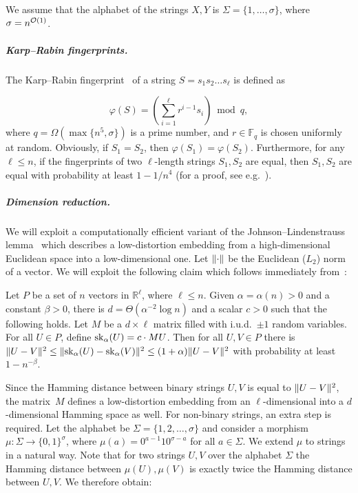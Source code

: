We assume that the alphabet of the strings $X, Y$ is $\Sigma = \{1,\ldots,\sigma\}$, where $\sigma = n^{\mathcal{O}(1)}$.

\subparagraph*{Karp--Rabin fingerprints. } The Karp--Rabin fingerprint~\cite{DBLP:journals/ibmrd/KarpR87} of a string $S = s_1 s_2 \dots s_\ell$ is defined as

$$\varphi(S) = \left(\sum_{i = 1}^{\ell} r^{i-1} s_i\right) \bmod q,$$ 
%
where $q = \Omega(\max\{n^5, \sigma\})$ is a prime number, and $r \in \mathbb{F}_q$ is chosen uniformly at random.  Obviously, if $S_1 = S_2$, then $\varphi(S_1) = \varphi(S_2)$. Furthermore, for any $\ell \le n$, if the fingerprints of two $\ell$-length strings $S_1, S_2$ are equal, then $S_1, S_2$ are equal with probability at least $1-1/n^4$ (for a proof, see e.g.~\cite{Porat:09}).

\subparagraph*{Dimension reduction. } We will exploit a computationally efficient variant of the Johnson--Lindenstrauss lemma~\cite{MR737400} which describes a low-distortion embedding from a high-dimensional Euclidean space into a low-dimensional one. Let $\lVert\cdot\rVert$ be the Euclidean ($L_2$) norm of a vector. We will exploit the following claim which follows immediately from~\cite[Theorem 1.1]{ACHLIOPTAS2003671}:
 
\begin{lemma}\label{lm:dim_reduction}
Let $P$ be a set of $n$ vectors in $\mathbb{R}^{\ell}$, where $\ell \le n$. Given $\alpha = \alpha(n) > 0$ and a constant $\beta > 0$, there is $d = \Theta(\alpha^{-2}\log n)$ and a scalar $c > 0$ such that the following holds. Let $M$ be a $d \times \ell$ matrix filled with i.u.d.\ $\pm1$ random variables. For all $U \in P$, define $\mathrm{sk}_\alpha (U) = c \cdot M U$. Then for all $U,V \in P$ there is $\lVert U-V\rVert^2 \leq \lVert\mathrm{sk}_\alpha(U)-\mathrm{sk}_\alpha(V)\rVert^2 \leq (1+\alpha) \lVert U-V\rVert^2$ with probability at least $1- n^{-\beta}$. 
\end{lemma}

Since the Hamming distance between binary strings $U, V$ is equal to $\lVert U-V\rVert^2$, the matrix~$M$ defines a low-distortion embedding from an $\ell$-dimensional into a $d$-dimensional Hamming space as well. For non-binary strings, an extra step is required. Let the alphabet be $\Sigma = \{1, 2, \ldots, \sigma\}$ and consider a morphism $\mu : \Sigma \rightarrow \{0,1\}^\sigma$, where $\mu(a) = 0^{a-1} 1 0^{\sigma-a}$ for all $a \in \Sigma$. We extend $\mu$ to strings in a natural way. Note that for two strings $U, V$ over the alphabet $\Sigma$ the Hamming distance between $\mu(U), \mu(V)$ is exactly twice the Hamming distance between $U, V$. We therefore obtain:

